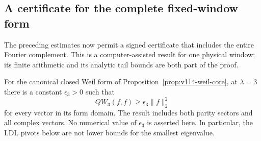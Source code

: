 \subsection*{A certificate for the complete fixed-window form}
The preceding estimates now permit a signed certificate that includes
the entire Fourier complement. This is a computer-assisted result for
one physical window; its finite arithmetic and its analytic tail bounds
are both part of the proof.

\begin{proposition}[Complete positivity at $\lambda=3$]
\label{prop:v116-window-positive}
For the canonical closed Weil form of
Proposition~\ref{prop:v114-weil-core}, at $\lambda=3$ there is a
constant $\epsilon_3>0$ such that
\[
 QW_3(f,f)\ge\epsilon_3\|f\|_2^2
\]
for every vector in its form domain. The result includes both parity
sectors and all complex vectors. No numerical value of $\epsilon_3$
is asserted here. In particular, the LDL pivots below are not lower
bounds for the smallest eigenvalue.
\end{proposition}

